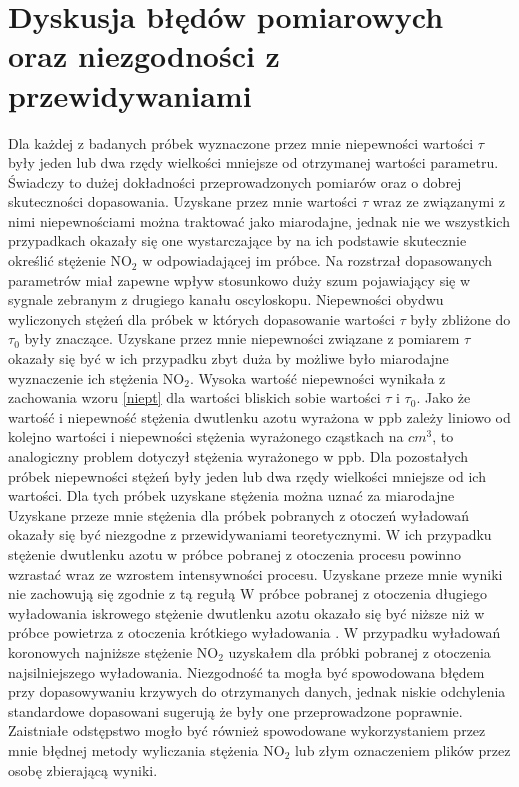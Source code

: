 \documentclass[10pt,a4paper]{article}
\begin{document}
\section{Dyskusja błędów pomiarowych oraz niezgodności z przewidywaniami}
Dla każdej z badanych próbek wyznaczone przez mnie niepewności wartości $\tau$ były jeden lub dwa rzędy wielkości mniejsze od otrzymanej wartości parametru. Świadczy to dużej dokładności przeprowadzonych pomiarów oraz o dobrej skuteczności dopasowania. Uzyskane przez mnie wartości $\tau$ wraz ze związanymi z nimi niepewnościami można traktować jako miarodajne, jednak nie we wszystkich przypadkach okazały się one wystarczające by na ich podstawie skutecznie określić stężenie $\text{NO}_{\text{2}}$ w odpowiadającej im próbce. Na rozstrzał dopasowanych parametrów miał zapewne wpływ stosunkowo duży szum pojawiający się w sygnale zebranym z drugiego kanału oscyloskopu.
Niepewności obydwu wyliczonych stężeń dla próbek w których dopasowanie wartości $\tau$ były zbliżone do $\tau_0$ były znaczące. Uzyskane przez mnie niepewności związane z pomiarem $\tau$ okazały się być w ich przypadku zbyt duża by możliwe było miarodajne wyznaczenie ich stężenia $\text{NO}_{\text{2}}$.  Wysoka wartość niepewności wynikała z zachowania wzoru \ref{niept}  dla wartości bliskich sobie wartości $\tau$ i $\tau_0$.  Jako że wartość  i niepewność stężenia dwutlenku azotu wyrażona w ppb zależy liniowo od kolejno wartości i niepewności  stężenia wyrażonego cząstkach na $cm^3$, to analogiczny problem dotyczył stężenia wyrażonego w ppb.
Dla pozostałych próbek niepewności stężeń były jeden lub dwa rzędy wielkości mniejsze od ich wartości. Dla tych próbek uzyskane stężenia można uznać za miarodajne
Uzyskane przeze mnie stężenia dla próbek pobranych z otoczeń wyładowań okazały się być niezgodne z przewidywaniami teoretycznymi. W ich przypadku stężenie dwutlenku azotu w próbce pobranej z otoczenia procesu powinno wzrastać wraz ze wzrostem intensywności procesu. Uzyskane przeze mnie wyniki nie zachowują się zgodnie z tą regułą  W próbce pobranej z otoczenia długiego wyładowania iskrowego stężenie dwutlenku azotu okazało się być niższe niż w próbce powietrza z otoczenia krótkiego wyładowania . W przypadku wyładowań koronowych najniższe stężenie $\text{NO}_{\text{2}}$ uzyskałem dla próbki pobranej z otoczenia najsilniejszego wyładowania. Niezgodność ta mogła być spowodowana błędem przy dopasowywaniu krzywych do otrzymanych danych, jednak niskie odchylenia standardowe dopasowani sugerują że były one przeprowadzone poprawnie. Zaistniałe odstępstwo mogło być również spowodowane wykorzystaniem przez mnie błędnej metody wyliczania stężenia $\text{NO}_{\text{2}}$ lub złym oznaczeniem plików przez osobę zbierającą wyniki. 
\end{document}

